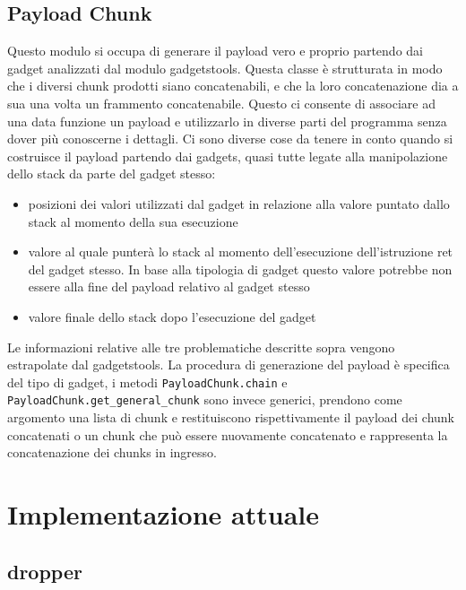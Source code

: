 \subsection{Payload Chunk}

Questo modulo si occupa di generare il payload vero e proprio partendo
dai gadget analizzati dal modulo gadgetstools. Questa classe è
strutturata in modo che i diversi chunk prodotti siano concatenabili,
e che la loro concatenazione dia a sua una volta un frammento
concatenabile. Questo ci consente di associare ad una data funzione un
payload e utilizzarlo in diverse parti del programma senza dover più
conoscerne i dettagli. Ci sono diverse cose da tenere in conto quando
si costruisce il payload partendo dai gadgets, quasi tutte legate alla
manipolazione dello stack da parte del gadget stesso:

\begin{itemize}

  \item posizioni dei valori utilizzati dal gadget in relazione alla
    valore puntato dallo stack al momento della sua esecuzione

  \item valore al quale punterà lo stack al momento dell'esecuzione
    dell'istruzione ret del gadget stesso. In base alla tipologia di
    gadget questo valore potrebbe non essere alla fine del payload
    relativo al gadget stesso
    
  \item valore finale dello stack dopo l'esecuzione del gadget

\end{itemize}

Le informazioni relative alle tre problematiche descritte sopra
vengono estrapolate dal gadgetstools. La procedura di generazione del
payload è specifica del tipo di gadget, i metodi
\lstinline{PayloadChunk.chain} e
\lstinline{PayloadChunk.get_general_chunk} sono invece generici,
prendono come argomento una lista di chunk e restituiscono
rispettivamente il payload dei chunk concatenati o un chunk che può
essere nuovamente concatenato e rappresenta la concatenazione dei
chunks in ingresso.


\section{Implementazione attuale}

\subsection{dropper}

